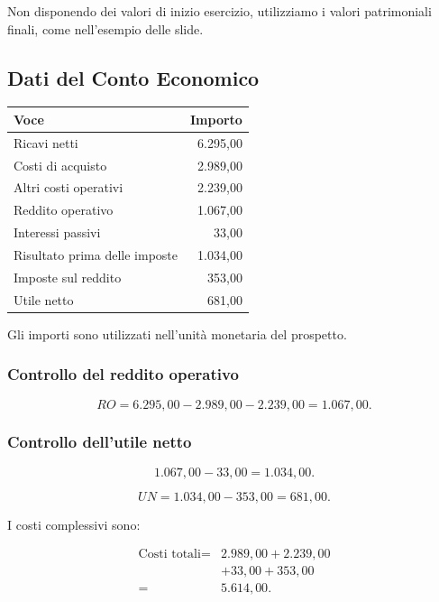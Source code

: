 \noindent Non disponendo dei valori
di inizio esercizio,
utilizziamo i valori patrimoniali finali,
come nell'esempio delle slide.


\subsection*{Dati del Conto Economico}

\begin{center}
    \begin{tabular}{|l|r|}
        \hline
        \textbf{Voce} & \textbf{Importo} \\
        \hline
        Ricavi netti & 6.295,00 \\
        Costi di acquisto & 2.989,00 \\
        Altri costi operativi & 2.239,00 \\
        Reddito operativo & 1.067,00 \\
        Interessi passivi & 33,00 \\
        Risultato prima delle imposte & 1.034,00 \\
        Imposte sul reddito & 353,00 \\
        Utile netto & 681,00 \\
        \hline
    \end{tabular}
\end{center}

\noindent Gli importi sono utilizzati
nell'unità monetaria del prospetto.


\subsubsection*{Controllo del reddito operativo}

\[
RO=
6.295{,}00-2.989{,}00-2.239{,}00
=
\boxed{1.067{,}00}.
\]


\subsubsection*{Controllo dell'utile netto}

\[
1.067{,}00-33{,}00
=
1.034{,}00.
\]

\[
UN=
1.034{,}00-353{,}00
=
\boxed{681{,}00}.
\]

\noindent I costi complessivi sono:

\[
\begin{aligned}
\text{Costi totali}
={}&2.989{,}00+2.239{,}00\\
&+33{,}00+353{,}00\\
={}&\boxed{5.614{,}00}.
\end{aligned}
\]

